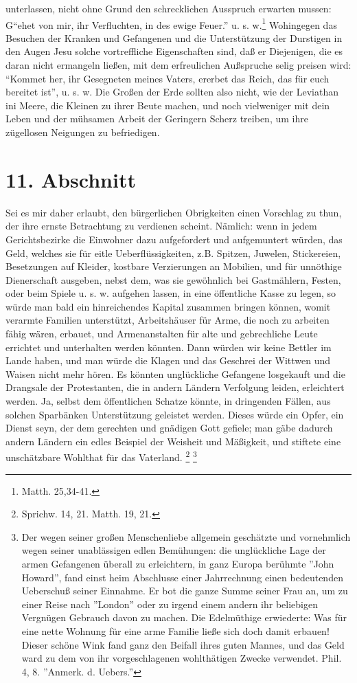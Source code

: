 unterlassen, nicht ohne Grund den schrecklichen Ausspruch erwarten mussen:
G"`ehet von mir, ihr Verfluchten, in des ewige Feuer."' u. s. w.\footnote{Matth.
25,34-41.} Wohingegen das Besuchen der Kranken und Gefangenen und die
Unterstützung der Durstigen in den Augen Jesu solche vortreffliche Eigenschaften
sind, daß er Diejenigen, die es daran nicht ermangeln ließen, mit dem
erfreulichen Außspruche selig preisen wird: "`Kommet her, ihr Gesegneten meines
Vaters, ererbet das Reich, das für euch bereitet ist"', u. s. w. Die Großen der
Erde sollten also nicht, wie der Leviathan ini Meere, die Kleinen zu ihrer Beute
machen, und noch vielweniger mit dein Leben und der mühsamen Arbeit der
Geringern Scherz treiben, um ihre zügellosen Neigungen zu befriedigen.

\section{11. Abschnitt}

Sei es mir daher erlaubt, den bürgerlichen Obrigkeiten einen Vorschlag zu thun,
der ihre ernste Betrachtung zu verdienen scheint. Nämlich: wenn in jedem
Gerichtsbezirke die Einwohner dazu aufgefordert und aufgemuntert würden, das
Geld, welches sie für eitle Ueberflüssigkeiten, z.B. Spitzen, Juwelen,
Stickereien, Besetzungen auf Kleider, kostbare Verzierungen an Mobilien, und für
unnöthige Dienerschaft ausgeben, nebst dem, was sie gewöhnlich bei Gastmählern,
Festen, oder beim Spiele u. s. w. aufgehen lassen, in eine öffentliche Kasse zu
legen, so würde man bald ein hinreichendes Kapital zusammen bringen können,
womit verarmte Familien unterstützt, Arbeitshäuser für Arme, die noch zu
arbeiten fähig wären, erbauet, und Armenanstalten für alte und gebrechliche
Leute errichtet und unterhalten werden könnten. Dann
würden wir keine Bettler im Lande haben, und man würde die Klagen und das
Geschrei der Wittwen und Waisen nicht mehr hören. Es könnten unglückliche
Gefangene losgekauft und die Drangsale der Protestanten, die in andern Ländern
Verfolgung leiden, erleichtert werden. Ja,
selbst dem öffentlichen Schatze könnte, in dringenden Fällen, aus solchen
Sparbänken Unterstützung geleistet werden. Dieses würde ein Opfer, ein Dienst
seyn, der dem gerechten und gnädigen Gott gefiele; man gäbe dadurch andern
Ländern ein edles Beispiel der Weisheit und Mäßigkeit, und stiftete eine
unschätzbare Wohlthat für das Vaterland.
\footnote{Sprichw. 14, 21. Matth. 19, 21.} \footnote{Der wegen seiner großen
Menschenliebe allgemein geschätzte und vornehmlich wegen seiner unablässigen
edlen Bemühungen: die unglückliche Lage der armen Gefangenen überall zu
erleichtern, in ganz Europa berühmte ''John Howard'', fand einst heim Abschlusse
einer Jahrrechnung einen bedeutenden Ueberschuß seiner Einnahme. Er bot die
ganze Summe seiner Frau an, um zu einer Reise nach ''London'' oder zu irgend
einem andern ihr beliebigen Vergnügen Gebrauch davon zu machen. Die Edelmüthige
erwiederte: Was für eine nette Wohnung für eine arme Familie ließe sich doch
damit erbauen! Dieser schöne Wink fand ganz den Beifall
ihres guten Mannes, und das Geld ward zu dem von ihr vorgeschlagenen
wohlthätigen Zwecke verwendet. Phil. 4, 8.
''Anmerk. d. Uebers.''}

